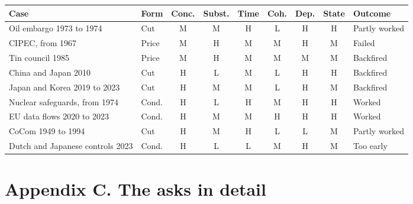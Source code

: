 \documentclass[11pt]{article}
\begin{document}
\begin{center}\small
\setlength{\tabcolsep}{4pt}
\begin{tabularx}{\linewidth}{@{}X l c c c c c c l@{}}
\toprule
\textbf{Case} & \textbf{Form} & \textbf{Conc.} & \textbf{Subst.} & \textbf{Time} & \textbf{Coh.} & \textbf{Dep.} & \textbf{State} & \textbf{Outcome}\\
\midrule
Oil embargo 1973 to 1974 & Cut & M & M & H & L & H & H & Partly worked\\
CIPEC, from 1967 & Price & M & H & M & M & H & M & Failed\\
Tin council 1985 & Price & M & H & M & M & M & M & Backfired\\
China and Japan 2010 & Cut & H & L & M & L & H & H & Backfired\\
Japan and Korea 2019 to 2023 & Cut & H & M & M & L & H & M & Backfired\\
Nuclear safeguards, from 1974 & Cond. & H & L & H & M & H & H & Worked\\
EU data flows 2020 to 2023 & Cond. & H & M & M & H & H & H & Worked\\
CoCom 1949 to 1994 & Cut & H & M & H & L & L & M & Partly worked\\
Dutch and Japanese controls 2023 & Cond. & H & L & L & M & H & M & Too early\\
\bottomrule
\end{tabularx}
\end{center}

\section*{Appendix C. The asks in detail}
\end{document}

